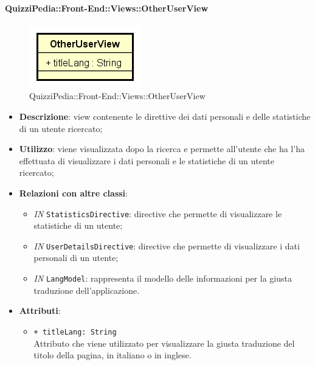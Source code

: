 \paragraph{QuizziPedia::Front-End::Views::OtherUserView}
\begin{figure} [ht]
	\centering
	\includegraphics[scale=0.45]{UML/Classi/Front-End/QuizziPedia_Front-end_Views_OtherUserView.png}
	\caption{QuizziPedia::Front-End::Views::OtherUserView}
\end{figure} \FloatBarrier
\begin{itemize}
	\item \textbf{Descrizione}: view contenente le direttive dei dati personali e delle statistiche di un utente ricercato;
	\item \textbf{Utilizzo}: viene visualizzata dopo la ricerca e permette all'utente che ha l'ha effettuata di visualizzare i dati personali e le statistiche di un utente ricercato;
	\item \textbf{Relazioni con altre classi}:
	\begin{itemize}
		\item \textit{IN} \texttt{StatisticsDirective}: directive che permette di visualizzare le statistiche di un utente;
		\item \textit{IN} \texttt{UserDetailsDirective}: directive che permette di visualizzare i dati personali di un utente;
		\item \textit{IN} \texttt{LangModel}: rappresenta il modello delle informazioni per la giusta traduzione dell'applicazione.
	\end{itemize}
	\item \textbf{Attributi}:
	\begin{itemize}
		\item \texttt{+ titleLang: String} \\ Attributo che viene utilizzato per visualizzare la giusta traduzione del titolo della pagina, in italiano o in inglese.
	\end{itemize}
\end{itemize}


